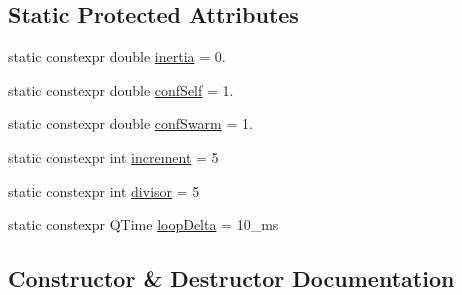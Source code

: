 \subsection*{Static Protected Attributes}
\begin{DoxyCompactItemize}
\item 
static constexpr double \mbox{\hyperlink{classokapi_1_1PIDTuner_af70d618cad57725e416a9efad2812384}{inertia}} = 0.
\item 
static constexpr double \mbox{\hyperlink{classokapi_1_1PIDTuner_a7fdfc18fff603aeac1785649fdc92773}{conf\+Self}} = 1.
\item 
static constexpr double \mbox{\hyperlink{classokapi_1_1PIDTuner_a6329b9e4c891a1e1dfdbdd68d553bcc4}{conf\+Swarm}} = 1.
\item 
static constexpr int \mbox{\hyperlink{classokapi_1_1PIDTuner_a0aafbd52157a5fed3dcf995f88b30478}{increment}} = 5
\item 
static constexpr int \mbox{\hyperlink{classokapi_1_1PIDTuner_a5cc51a97600a9114104afb9923056c79}{divisor}} = 5
\item 
static constexpr Q\+Time \mbox{\hyperlink{classokapi_1_1PIDTuner_aedcb493e227469c2016d2267588a50bd}{loop\+Delta}} = 10\+\_\+ms
\end{DoxyCompactItemize}


\subsection{Constructor \& Destructor Documentation}
\mbox{\label{classokapi_1_1PIDTuner_a44dc4eed9bb29fd51a18bb97f8fde038}} 
